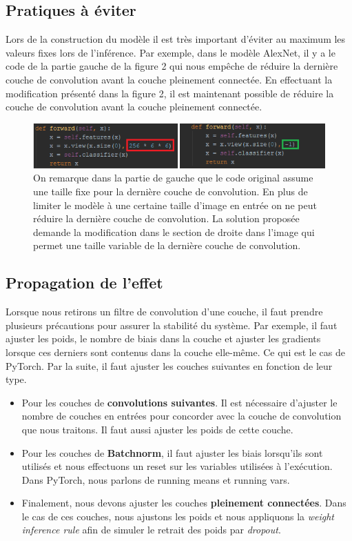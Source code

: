 \documentclass[12pt]{article}
\begin{document}
\subsection{Pratiques à éviter}
Lors de la construction du modèle il est très important d’éviter au maximum les valeurs fixes lors de l’inférence. Par exemple, dans le modèle AlexNet, il y a le code de la partie gauche de la figure 2 qui nous empêche de réduire la dernière couche de convolution avant la couche pleinement connectée. En effectuant la modification présenté dans la figure 2, il est maintenant possible de réduire la couche de convolution avant la couche pleinement connectée. 
\begin{figure}[H]
	\centering
	\includegraphics{mistake}
	\caption{On remarque dans la partie de gauche que le code original assume une taille fixe pour la dernière couche de convolution. En plus de limiter le modèle à une certaine taille d'image en entrée on ne peut réduire la dernière couche de convolution. La solution proposée demande la modification dans le section de droite dans l'image qui permet une taille variable de la dernière couche de convolution.}
	\label{fig:mistake}
\end{figure}


\subsection{Propagation de l’effet}
Lorsque nous retirons un filtre de convolution d’une couche, il faut prendre plusieurs précautions pour assurer la stabilité du système. Par exemple, il faut ajuster les poids, le nombre de biais dans la couche et ajuster les gradients lorsque ces derniers sont contenus dans la couche elle-même. Ce qui est le cas de PyTorch.
\newpage
Par la suite, il faut ajuster les couches suivantes en fonction de leur type.
\begin{itemize}[noitemsep, noitemsep, label={}]
	\item Pour les couches de \textbf{convolutions suivantes}. Il est nécessaire d’ajuster le nombre de couches en entrées pour concorder avec la couche de convolution que nous traitons. Il faut aussi ajuster les poids de cette couche. 
	\item Pour les couches de \textbf{Batchnorm}, il faut ajuster les biais lorsqu'ils sont utilisés et nous effectuons un reset sur les variables utilisées à l’exécution. Dans PyTorch, nous parlons de running means et running vars. 
	\item Finalement, nous devons ajuster les couches \textbf{pleinement connectées}. Dans le cas de ces couches, nous ajustons les poids et nous appliquons la \textit{weight inference rule}\cite{weightinference} afin de simuler le retrait des poids par \textit{dropout}. 
\end{itemize}
\end{document}
